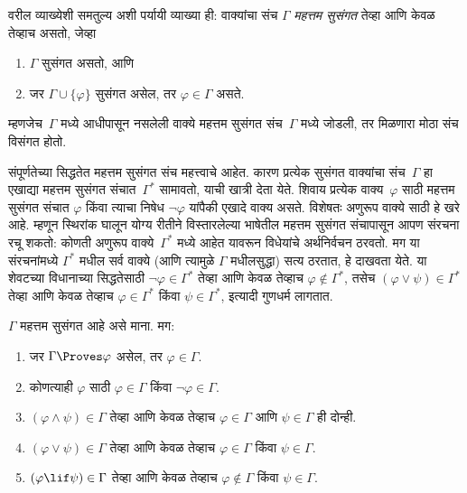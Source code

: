 \begin{explain}
वरील व्याख्येशी समतुल्य अशी पर्यायी व्याख्या ही: वाक्यांचा संच $\Gamma$
\emph{महत्तम सुसंगत} तेव्हा आणि केवळ तेव्हाच असतो, जेव्हा
\begin{enumerate}
\item $\Gamma$ सुसंगत असतो, आणि
\item जर $\Gamma \cup \{ \varphi \}$ सुसंगत असेल, तर $\varphi \in \Gamma$ असते.
\end{enumerate}
म्हणजेच~$\Gamma$ मध्ये आधीपासून नसलेली वाक्ये महत्तम सुसंगत
संच~$\Gamma$ मध्ये जोडली, तर मिळणारा मोठा संच विसंगत होतो.
\end{explain}

\begin{explain}
संपूर्णतेच्या सिद्धतेत महत्तम सुसंगत संच महत्त्वाचे आहेत. कारण प्रत्येक
सुसंगत वाक्यांचा संच~$\Gamma$ हा एखाद्या महत्तम सुसंगत
संचात~$\Gamma^*$ सामावतो, याची खात्री देता येते. शिवाय प्रत्येक
वाक्य~$\varphi$ साठी महत्तम सुसंगत संचात $\varphi$ किंवा त्याचा
निषेध $ \lnot \varphi$ यांपैकी एखादे वाक्य असते. विशेषतः अणुरूप वाक्ये साठी हे खरे
आहे. म्हणून स्थिरांक घालून योग्य रीतीने विस्तारलेल्या भाषेतील
महत्तम सुसंगत संचापासून आपण संरचना रचू शकतो: कोणती अणुरूप
वाक्ये~$\Gamma^*$ मध्ये आहेत यावरून विधेयांचे
अर्थनिर्वचन ठरवतो. मग या संरचनांमध्ये $\Gamma^*$ मधील
सर्व वाक्ये (आणि त्यामुळे $\Gamma$ मधीलसुद्धा) सत्य ठरतात,
हे दाखवता येते. या शेवटच्या विधानाच्या सिद्धतेसाठी
$\lnot \varphi \in \Gamma^*$ तेव्हा आणि केवळ तेव्हाच $\varphi \notin
\Gamma^*$, तसेच $(\varphi \lor \psi) \in \Gamma^*$ तेव्हा आणि केवळ तेव्हाच
$\varphi \in \Gamma^*$ किंवा $\psi \in \Gamma^*$, इत्यादी गुणधर्म लागतात.
\end{explain}

\begin{prop}
\label{fol:com:mcs:prop:mcs}
$\Gamma$ महत्तम सुसंगत आहे असे माना. मग:
\begin{enumerate}
\item \label{fol:com:mcs:prop:mcs-prov-in} जर $\Gamma \Proves \varphi$ असेल, तर $\varphi \in
  \Gamma$.

\item \label{fol:com:mcs:prop:mcs-either-or} कोणत्याही $\varphi$ साठी $\varphi \in
  \Gamma$ किंवा $\lnot \varphi \in \Gamma$.

\item \label{fol:com:mcs:prop:mcs-and} $(\varphi \land \psi) \in \Gamma$
  तेव्हा आणि केवळ तेव्हाच $\varphi \in \Gamma$ आणि $\psi \in \Gamma$ ही दोन्ही.

\item \label{fol:com:mcs:prop:mcs-or} $(\varphi \lor \psi) \in \Gamma$
  तेव्हा आणि केवळ तेव्हाच $\varphi \in \Gamma$ किंवा $\psi \in \Gamma$.

\item \label{fol:com:mcs:prop:mcs-if} $(\varphi \lif \psi) \in \Gamma$
  तेव्हा आणि केवळ तेव्हाच $\varphi \notin \Gamma$ किंवा $\psi \in \Gamma$.
\end{enumerate}
\end{prop}


